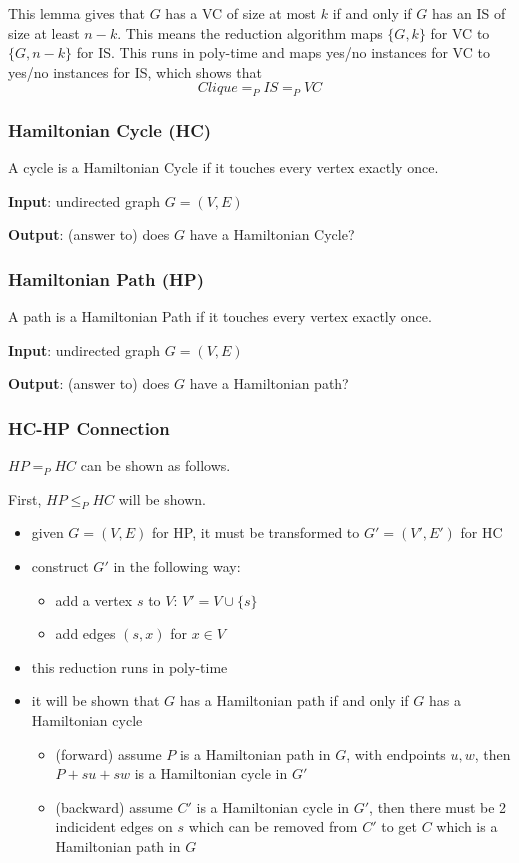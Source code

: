 \documentclass[11pt]{article}
\begin{document}
This lemma gives that \(G\) has a VC of size at most \(k\) if and only if \(G\) has an IS
of size at least \(n-k\).
This means the reduction algorithm maps \(\{G, k\}\) for VC to \(\{G, n-k\}\) for IS.
This runs in poly-time and maps yes/no instances for VC to yes/no instances for IS,
which shows that
$$
Clique =_{P} IS =_{P} VC
$$
\subsubsection{Hamiltonian Cycle (HC)}
\label{sec:org35ad3d0}
A cycle is a Hamiltonian Cycle if it touches every vertex exactly once.

\textbf{Input}: undirected graph \(G = (V,E)\)

\textbf{Output}: (answer to) does \(G\) have a Hamiltonian Cycle?
\subsubsection{Hamiltonian Path (HP)}
\label{sec:orgf1bc16a}
A path is a Hamiltonian Path if it touches every vertex exactly once.

\textbf{Input}: undirected graph \(G = (V,E)\)

\textbf{Output}: (answer to) does \(G\) have a Hamiltonian path?
\subsubsection{HC-HP Connection}
\label{sec:org4f99064}
\(HP =_{P} HC\) can be shown as follows.

First, \(HP \le_{P} HC\) will be shown.
\begin{itemize}
\item given \(G = (V,E)\) for HP, it must be transformed to \(G' = (V', E')\) for HC
\item construct \(G'\) in the following way:
\begin{itemize}
\item add a vertex \(s\) to \(V\): \(V' = V \cup \{s\}\)
\item add edges \((s,x)\) for \(x \in V\)
\end{itemize}
\item this reduction runs in poly-time
\item it will be shown that \(G\) has a Hamiltonian path if and only if \(G\) has a
Hamiltonian cycle
\begin{itemize}
\item (forward) assume \(P\) is a Hamiltonian path in \(G\), with endpoints \(u,w\),
then \(P + su + sw\) is a Hamiltonian cycle in \(G'\)
\item (backward) assume \(C'\) is a Hamiltonian cycle in \(G'\), then there must be
2 indicident edges on \(s\) which can be removed from \(C'\) to get \(C\)
which is a Hamiltonian path in \(G\)
\end{itemize}
\end{itemize}
\end{document}
